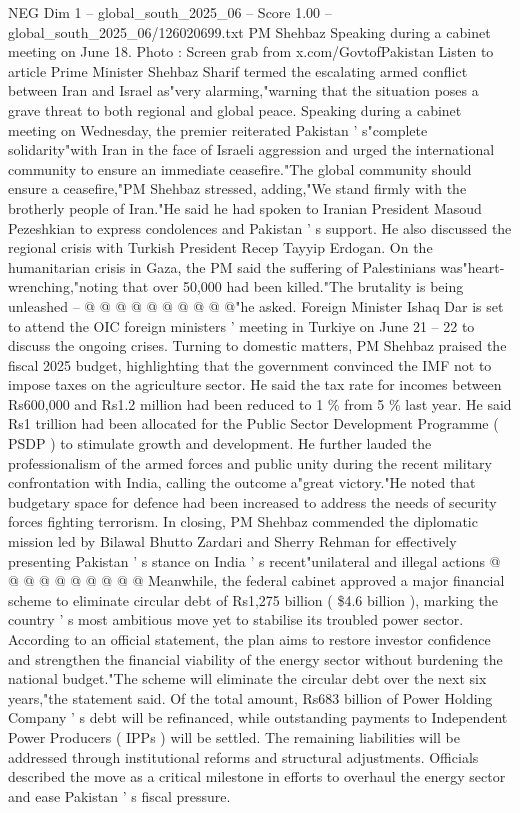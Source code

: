 \begin{textsample}{NEG Dim 1 – global\_south\_2025\_06 – Score 1.00 – global\_south\_2025\_06/126020699.txt}  \label{ex:f1_neg_312}
PM Shehbaz Speaking during a cabinet meeting on June 18.
Photo : Screen grab from x.com/GovtofPakistan Listen to article Prime Minister Shehbaz Sharif termed the escalating armed conflict between Iran and Israel as"very alarming,"warning that the situation poses a grave threat to both regional and global peace.
Speaking during a cabinet meeting on Wednesday, the premier reiterated Pakistan ' s"complete solidarity"with Iran in the face of Israeli aggression and urged the international community to ensure an immediate ceasefire."The global community should ensure a ceasefire,"PM Shehbaz stressed, adding,"We stand firmly with the brotherly people of Iran."He said he had spoken to Iranian President Masoud Pezeshkian to express condolences and Pakistan ' s support.
He also discussed the regional crisis with Turkish President Recep Tayyip Erdogan.
On the humanitarian crisis in Gaza, the PM said the suffering of Palestinians was"heart-wrenching,"noting that over 50,000 had been killed."The brutality is being unleashed -- @ @ @ @ @ @ @ @ @ @"he asked.
Foreign Minister Ishaq Dar is set to attend the OIC foreign ministers ' meeting in Turkiye on June 21 -- 22 to discuss the ongoing crises.
Turning to domestic matters, PM Shehbaz praised the fiscal 2025 budget, highlighting that the government convinced the IMF not to impose taxes on the agriculture sector.
He said the tax rate for incomes between Rs600,000 and Rs1.2 million had been reduced to 1 \% from 5 \% last year.
He said Rs1 trillion had been allocated for the Public Sector Development Programme ( PSDP ) to stimulate growth and development.
He further lauded the professionalism of the armed forces and public unity during the recent military confrontation with India, calling the outcome a"great victory."He noted that budgetary space for defence had been increased to address the needs of security forces fighting terrorism.
In closing, PM Shehbaz commended the diplomatic mission led by Bilawal Bhutto Zardari and Sherry Rehman for effectively presenting Pakistan ' s stance on India ' s recent"unilateral and illegal actions @ @ @ @ @ @ @ @ @ @ Meanwhile, the federal cabinet approved a major financial scheme to eliminate circular debt of Rs1,275 billion ( \$4.6 billion ), marking the country ' s most ambitious move yet to stabilise its troubled power sector.
According to an official statement, the plan aims to restore investor confidence and strengthen the financial viability of the energy sector without burdening the national budget."The scheme will eliminate the circular debt over the next six years,"the statement said.
Of the total amount, Rs683 billion of Power Holding Company ' s debt will be refinanced, while outstanding payments to Independent Power Producers ( IPPs ) will be settled.
The remaining liabilities will be addressed through institutional reforms and structural adjustments.
Officials described the move as a critical milestone in efforts to overhaul the energy sector and ease Pakistan ' s fiscal pressure.

\end{textsample}
